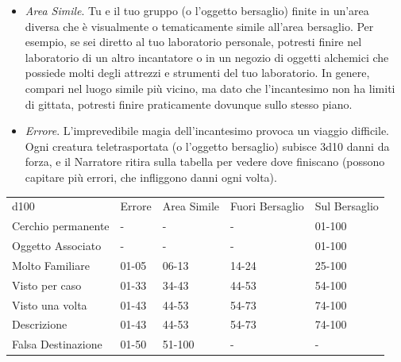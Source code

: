 \begin{multicols}{2}
\begin{itemize}[leftmargin=*]
	\item \emph{Area Simile}. Tu e il tuo gruppo (o l'oggetto bersaglio) finite in un'area diversa che è visualmente o tematicamente simile all'area bersaglio. Per esempio, se sei diretto al tuo laboratorio personale, potresti finire nel laboratorio di un altro incantatore o in un negozio di oggetti alchemici che possiede molti degli attrezzi e strumenti del tuo laboratorio. In genere, compari nel luogo simile più vicino, ma dato che l'incantesimo non ha limiti di gittata, potresti finire praticamente dovunque sullo stesso piano.
	\item \emph{Errore}. L'imprevedibile magia dell'incantesimo provoca un viaggio difficile. Ogni creatura teletrasportata (o l'oggetto bersaglio) subisce 3d10 danni da forza, e il Narratore ritira sulla tabella per vedere dove finiscano (possono capitare più errori, che infliggono danni ogni volta).
\end{itemize}

\end{multicols}

\medskip

\noindent\begin{tabularx}{0.95\textwidth}{lllll}
\toprule
d100 &Errore&Area Simile&Fuori Bersaglio&Sul Bersaglio\\
Cerchio permanente&-&-&-&01-100\\
Oggetto Associato&-&-&-&01-100\\
Molto Familiare&01-05&06-13&14-24&25-100\\
Visto per caso&01-33&34-43&44-53&54-100\\
Visto una volta&01-43&44-53&54-73&74-100\\
Descrizione&01-43&44-53&54-73&74-100\\
Falsa Destinazione&01-50&51-100&-&-
\end{tabularx}

\medskip

